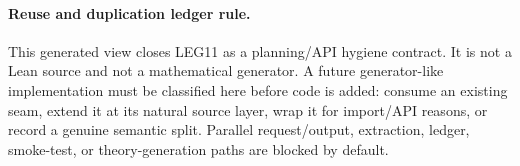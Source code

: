 \paragraph{Reuse and duplication ledger rule.} This generated view closes LEG11 as a planning/API hygiene contract. It is not a Lean source and not a mathematical generator. A future generator-like implementation must be classified here before code is added: consume an existing seam, extend it at its natural source layer, wrap it for import/API reasons, or record a genuine semantic split. Parallel request/output, extraction, ledger, smoke-test, or theory-generation paths are blocked by default.

